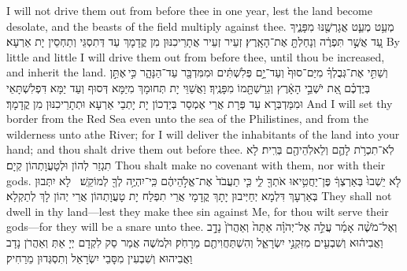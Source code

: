 {I will not drive them out from before thee in one year, lest the land become desolate, and the beasts of the field multiply against thee.}{}
{מְעַ֥ט מְעַ֛ט אֲגָרְשֶׁ֖נּוּ מִפָּנֶ֑יךָ עַ֚ד אֲשֶׁ֣ר תִּפְרֶ֔ה וְנָחַלְתָּ֖ אֶת־הָאָֽרֶץ׃
}
{זְעֵיר זְעֵיר אֲתָרֵיכִנּוּן מִן קֳדָמָךְ עַד דְּתִסְגֵּי וְתַחְסֵין יָת אַרְעָא׃}
{By little and little I will drive them out from before thee, until thou be increased, and inherit the land.}{}
{וְשַׁתִּ֣י אֶת־גְּבֻלְךָ֗ מִיַּם־סוּף֙ וְעַד־יָ֣ם פְּלִשְׁתִּ֔ים וּמִמִּדְבָּ֖ר עַד־הַנָּהָ֑ר כִּ֣י \legarmeh  אֶתֵּ֣ן בְּיֶדְכֶ֗ם אֵ֚ת יֹשְׁבֵ֣י הָאָ֔רֶץ וְגֵרַשְׁתָּ֖מוֹ מִפָּנֶֽיךָ׃
}
{וַאֲשַׁוֵּי יָת תְּחוּמָךְ מִיַּמָּא דְּסוּף וְעַד יַמָּא דִּפְלִשְׁתָּאֵי וּמִמַּדְבְּרָא עַד פְּרָת אֲרֵי אֶמְסַר בְּיַדְכוֹן יָת יָתְבֵי אַרְעָא וּתְתָרֵיכִנּוּן מִן קֳדָמָךְ׃}
{And I will set thy border from the Red Sea even unto the sea of the Philistines, and from the wilderness unto athe River; for I will deliver the inhabitants of the land into your hand; and thou shalt drive them out before thee.}{}
{לֹֽא־תִכְרֹ֥ת לָהֶ֛ם וְלֵאלֹֽהֵיהֶ֖ם בְּרִֽית׃}
{לָא תִגְזַר לְהוֹן וּלְטָעֲוָתְהוֹן קְיָם׃}
{Thou shalt make no covenant with them, nor with their gods.}{}
{לֹ֤א יֵשְׁבוּ֙ בְּאַרְצְךָ֔ פֶּן־יַחֲטִ֥יאוּ אֹתְךָ֖ לִ֑י כִּ֤י תַעֲבֹד֙ אֶת־אֱלֹ֣הֵיהֶ֔ם כִּֽי־יִהְיֶ֥ה לְךָ֖ לְמוֹקֵֽשׁ׃ \petucha 
{}}
{לָא יִתְּבוּן בְּאַרְעָךְ דִּלְמָא יְחַיְּיבוּן יָתָךְ קֳדָמָי אֲרֵי תִפְלַח יָת טָעֲוָתְהוֹן אֲרֵי יְהוֹן לָךְ לְתַקְלָא׃}
{They shall not dwell in thy land—lest they make thee sin against Me, for thou wilt serve their gods—for they will be a snare unto thee.}{}
\newperek
{}%
{וְאֶל־מֹשֶׁ֨ה אָמַ֜ר עֲלֵ֣ה אֶל־יְהֹוָ֗ה אַתָּה֙ וְאַהֲרֹן֙ נָדָ֣ב וַאֲבִיה֔וּא וְשִׁבְעִ֖ים מִזִּקְנֵ֣י יִשְׂרָאֵ֑ל וְהִשְׁתַּחֲוִיתֶ֖ם מֵרָחֹֽק׃
}
{וּלְמֹשֶׁה אֲמַר סַק לִקְדָם יְיָ אַתְּ וְאַהֲרֹן נָדָב וַאֲבִיהוּא וְשִׁבְעִין מִסָּבֵי יִשְׂרָאֵל וְתִסְגְּדוּן מֵרַחִיק׃}
